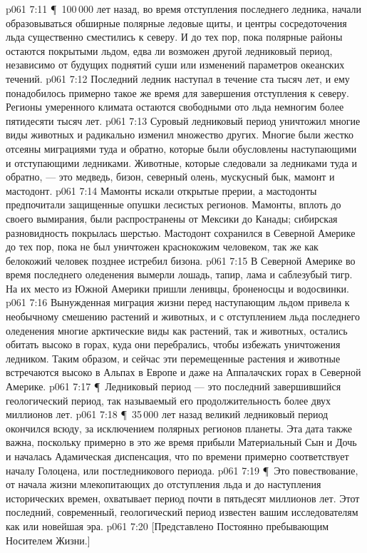 \vs p061 7:11 \P\ 100\,000 лет назад, во время отступления последнего ледника, начали образовываться обширные полярные ледовые щиты, и центры сосредоточения льда существенно сместились к северу. И до тех пор, пока полярные районы остаются покрытыми льдом, едва ли возможен другой ледниковый период, независимо от будущих поднятий суши или изменений параметров океанских течений.
\vs p061 7:12 Последний ледник наступал в течение ста тысяч лет, и ему понадобилось примерно такое же время для завершения отступления к северу. Регионы умеренного климата остаются свободными ото льда немногим более пятидесяти тысяч лет.
\vs p061 7:13 Суровый ледниковый период уничтожил многие виды животных и радикально изменил множество других. Многие были жестко отсеяны миграциями туда и обратно, которые были обусловлены наступающими и отступающими ледниками. Животные, которые следовали за ледниками туда и обратно, --- это медведь, бизон, северный олень, мускусный бык, мамонт и мастодонт.
\vs p061 7:14 Мамонты искали открытые прерии, а мастодонты предпочитали защищенные опушки лесистых регионов. Мамонты, вплоть до своего вымирания, были распространены от Мексики до Канады; сибирская разновидность покрылась шерстью. Мастодонт сохранился в Северной Америке до тех пор, пока не был уничтожен краснокожим человеком, так же как белокожий человек позднее истребил бизона.
\vs p061 7:15 В Северной Америке во время последнего оледенения вымерли лошадь, тапир, лама и саблезубый тигр. На их место из Южной Америки пришли ленивцы, броненосцы и водосвинки.
\vs p061 7:16 Вынужденная миграция жизни перед наступающим льдом привела к необычному смешению растений и животных, и с отступлением льда последнего оледенения многие арктические виды как растений, так и животных, остались обитать высоко в горах, куда они перебрались, чтобы избежать уничтожения ледником. Таким образом, и сейчас эти перемещенные растения и животные встречаются высоко в Альпах в Европе и даже на Аппалачских горах в Северной Америке.
\vs p061 7:17 \P\ Ледниковый период --- это последний завершившийся геологический период, так называемый  его продолжительность более двух миллионов лет.
\vs p061 7:18 \P\ 35\,000 лет назад великий ледниковый период окончился всюду, за исключением полярных регионов планеты. Эта дата также важна, поскольку примерно в это же время прибыли Материальный Сын и Дочь и началась Адамическая диспенсация, что по времени примерно соответствует началу Голоцена, или постледникового периода.
\vs p061 7:19 \P\ Это повествование, от начала жизни млекопитающих до отступления льда и до наступления исторических времен, охватывает период почти в пятьдесят миллионов лет. Этот последний, современный, геологический период известен вашим исследователям как  или новейшая эра.
\vs p061 7:20 [Представлено Постоянно пребывающим Носителем Жизни.]
